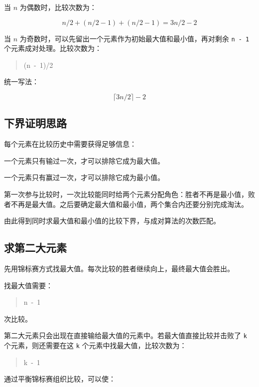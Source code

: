 \documentclass[UTF8,zihao=-4]{ctexart}
\begin{document}
当 $n$ 为偶数时，比较次数为：

\[n/2 + (n/2 - 1) + (n/2 - 1) = 3n/2 - 2\]

当 $n$ 为奇数时，可以先留出一个元素作为初始最大值和最小值，再对剩余 \texttt{n - 1} 个元素成对处理。比较次数为：

\begin{quote}
\small\ttfamily\raggedright
{}(n\ -\ 1)/2\\
\end{quote}

统一写法：

\[\lceil 3n/2 \rceil - 2\]

\subsection*{下界证明思路}

每个元素在比较历史中需要获得足够信息：

一个元素只有输过一次，才可以排除它成为最大值。

一个元素只有赢过一次，才可以排除它成为最小值。

第一次参与比较时，一次比较能同时给两个元素分配角色：胜者不再是最小值，败者不再是最大值。之后要确定最大值和最小值，两个集合内还要分别完成淘汰。

由此得到同时求最大值和最小值的比较下界，与成对算法的次数匹配。

\subsection*{求第二大元素}

先用锦标赛方式找最大值。每次比较的胜者继续向上，最终最大值会胜出。

找最大值需要：

\begin{quote}
\small\ttfamily\raggedright
\relax n\ -\ 1\\
\end{quote}

次比较。

第二大元素只会出现在直接输给最大值的元素中。若最大值直接比较并击败了 \texttt{k} 个元素，则还需要在这 \texttt{k} 个元素中找最大值，比较次数为：

\begin{quote}
\small\ttfamily\raggedright
\relax k\ -\ 1\\
\end{quote}

通过平衡锦标赛组织比较，可以使：
\end{document}
